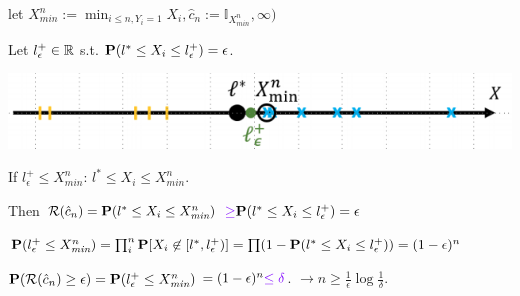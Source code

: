 let $X_{\textit{min}}^n := \min_{i\leq n, Y_i=1} X_i, \hat c_n := \mathbb I_{X_{\textit{min}}^n}, \infty)$


Let $l_\epsilon^+\in\R$ s.t. $\P(l^*\leq X_i \leq l_\epsilon^+) = \epsilon$.
\begin{center}
	\includegraphics[width=\columnwidth]{Resources/pac-halfline}
\end{center}
If $l_\epsilon^+ \leq X_{\textit{min}}^n$: $l^*\leq X_i \leq X_{\textit{min}}^n$.

Then $\mathcal R(\hat c_n) = \P(l^*\leq X_i \leq X_{\textit{min}}^n)$ ${\color{imp}\geq} \P(l^*\leq X_i \leq l_\epsilon^+) = \epsilon$

$\P(l_\epsilon^+\leq X_{\textit{min}}^n) = \prod_i^n \P[X_i\not\in[l^*, l_\epsilon^+)] = \prod(1 - \P(l^*\leq X_i \leq l_\epsilon^+)) = (1-\epsilon)^n$

$\P(\mathcal R(\hat c_n)\geq \epsilon) = \P(l_\epsilon^+\leq X_{\textit{min}}^n)$ 
$= (1-\epsilon)^n {\color{imp} \leq \delta}$. $\to n \geq \frac{1}{\epsilon}\log\frac{1}{\delta}$.

%
%
